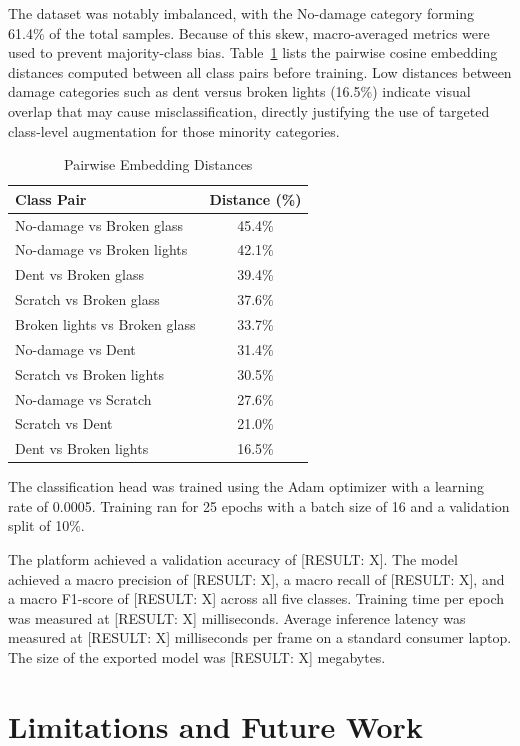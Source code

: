\documentclass[conference]{IEEEtran}
\begin{document}
The dataset was notably imbalanced, with the No-damage category forming 61.4\% of the total samples. Because of this skew, macro-averaged metrics were used to prevent majority-class bias. Table~\ref{tab:embedding_distance} lists the pairwise cosine embedding distances computed between all class pairs before training. Low distances between damage categories such as dent versus broken lights (16.5\%) indicate visual overlap that may cause misclassification, directly justifying the use of targeted class-level augmentation for those minority categories.

\begin{table}[htbp]
\centering
\caption{Pairwise Embedding Distances}
\label{tab:embedding_distance}
\begin{tabular}{lc}
\toprule
\textbf{Class Pair} & \textbf{Distance (\%)} \\
\midrule
No-damage vs Broken glass & 45.4\% \\
No-damage vs Broken lights & 42.1\% \\
Dent vs Broken glass & 39.4\% \\
Scratch vs Broken glass & 37.6\% \\
Broken lights vs Broken glass & 33.7\% \\
No-damage vs Dent & 31.4\% \\
Scratch vs Broken lights & 30.5\% \\
No-damage vs Scratch & 27.6\% \\
Scratch vs Dent & 21.0\% \\
Dent vs Broken lights & 16.5\% \\
\bottomrule
\end{tabular}
\end{table}

The classification head was trained using the Adam optimizer with a learning rate of 0.0005. Training ran for 25 epochs with a batch size of 16 and a validation split of 10\%. 

The platform achieved a validation accuracy of [RESULT: X]. The model achieved a macro precision of [RESULT: X], a macro recall of [RESULT: X], and a macro F1-score of [RESULT: X] across all five classes. Training time per epoch was measured at [RESULT: X] milliseconds. Average inference latency was measured at [RESULT: X] milliseconds per frame on a standard consumer laptop. The size of the exported model was [RESULT: X] megabytes.

\section{Limitations and Future Work}
\end{document}
